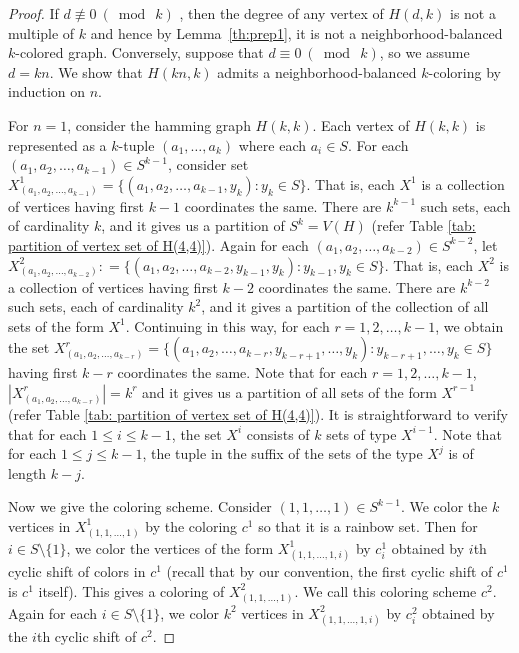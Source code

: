 \documentclass[12pt]{article}
\newcommand{\nbc}{neighborhood-balanced $k$-coloring\xspace}
\newcommand{\nbcd}{neighborhood-balanced $k$-colored\xspace}
\begin{document}
\begin{proof}
If $d \not \equiv 0\ (\bmod\ k)$ , then the degree of any vertex of $H(d,k)$ is not a multiple of $k$ and hence by Lemma~\ref{th:prep1}, it is not a \nbcd graph.
Conversely, suppose that $d \equiv 0\ (\bmod\ k)$, so we assume $d = kn$.
We show that $H(kn,k)$ admits a \nbc by induction on $n$.
\par
For $n=1$, consider the hamming graph $H(k,k)$.
Each vertex of $H(k,k)$ is represented as a $k$-tuple $(a_1, \dots, a_k)$ where each $a_i \in S$.
For each $(a_1, a_2, \dots, a_{k-1}) \in S^{k-1}$, consider set $X^{1}_{(a_1, a_2,  \dots, a_{k-1})} = \{(a_1, a_2,  \dots, a_{k-1}, y_k) : y_k \in S\}$.
That is, each $X^1$ is a collection of vertices having  first $k-1$ coordinates the same.
There are $k^{k-1}$ such sets, each of cardinality $k$, and it gives us a partition of $S^k = V(H)$ (refer Table \ref{tab: partition of vertex set of H(4,4)}).
Again for each $(a_1, a_2, \dots, a_{k-2}) \in S^{k-2}$, let $X^{2}_{(a_1, a_2, \dots, a_{k-2})} : = \{(a_1, a_2, \dots,a_{k-2}, y_{k-1}, y_{k}) : y_{k-1}, y_k \in S\}$.
That is, each $X^2$ is a collection of vertices having  first $k-2$ coordinates the same.
There are $k^{k-2}$ such sets, each of cardinality $k^2$, and it gives a partition of the collection of all sets of the form $X^1$.
Continuing in this way, for each $r = 1, 2, \dots, k-1$, we obtain the set $X^{r}_{(a_1,a_2,\dots,a_{k-r})} = \{(a_1,a_2, \dots, a_{k-r}, y_{k-r+1}, \dots, y_k) : y_{k-r+1}, \dots, y_k \in S\}$ having  first $k-r$ coordinates the same.
Note that for each $r = 1, 2, \dots, k-1$, $|X_{(a_1,a_2,\dots,a_{k-r})}^{r}| = k^r$ and it gives us a partition of all sets of the form $X^{r-1}$ (refer Table \ref{tab: partition of vertex set of H(4,4)}).
It is straightforward to verify that for each $1 \le i \le k-1$, the set $X^i$ consists of $k$ sets of type $X^{i-1}$.
Note that for each $1 \le j \le k-1$, the tuple in the suffix of the sets of the type $X^j$ is of length $k-j$.
\par
Now we give the coloring scheme.
Consider $(1, 1,\dots, 1) \in S^{k-1}$.
We color the $k$ vertices in $X^1_{(1,1, \dots, 1)}$ by the coloring $c^{1}$ so that it is a rainbow set.
Then for $i \in S \setminus \{1\}$, we color the vertices of the form $X^1_{(1,1, \dots, 1, i)}$ by $c^{1}_{i}$ obtained by $i$th cyclic shift of colors in $c^{1}$ (recall that by our convention, the first cyclic shift of $c^1$ is $c^1$ itself).
This gives a coloring of $X^2_{(1,1, \dots, 1)}$.
We call this coloring scheme $c^2$.
Again for each $i \in S \setminus \{1\} $, we color $k^2$ vertices in $X^{2}_{(1, 1, \dots, 1, i)}$ by $c^{2}_{i}$ obtained by the $i$th cyclic shift of $c^{2}$. 

\end{proof}
\end{document}
